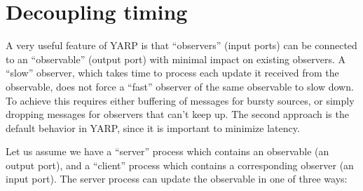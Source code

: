 
\section{Decoupling timing}

\label{sect:timing}

A very useful feature of YARP is that ``observers'' (input ports) can be connected to an
``observable'' (output port) with minimal impact on existing
observers.
%
A ``slow'' observer, which takes time to process each update it
received from the observable, does not force a ``fast'' observer of
the same observable to slow down.  To achieve this requires either buffering
of messages for bursty sources, or simply dropping messages for
observers that can't keep up.  The second approach is the default
behavior in YARP, since it is important to minimize latency.

Let us assume we have a ``server'' process which contains an
observable (an output port), and a ``client'' process
which contains a corresponding observer (an input port).
The server process can update the observable in one of three ways:

